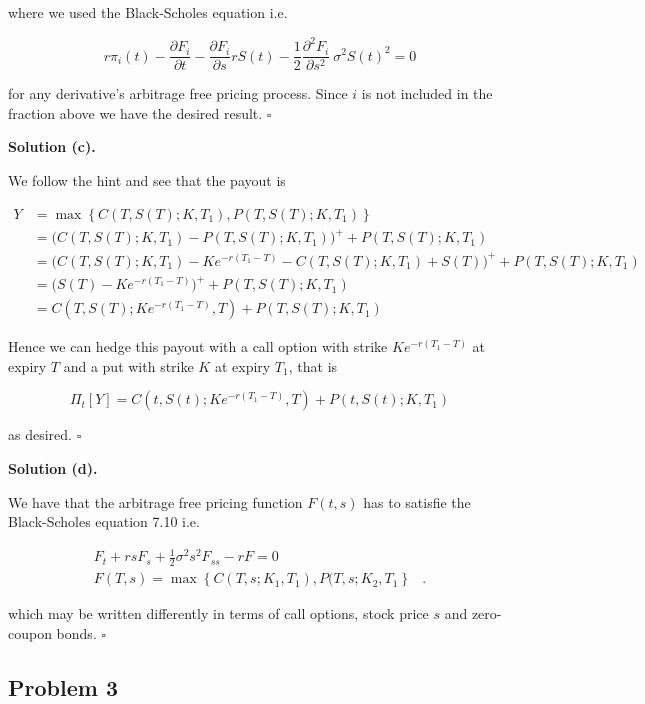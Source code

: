 \documentclass[
]{book}
\begin{document}
where we used the Black-Scholes equation i.e.

\[
r\pi_i(t)-\frac{\partial F_i}{\partial t}-\frac{\partial F_i}{\partial s}r S(t)-\frac{1}{2}\frac{\partial^2 F_i}{\partial s^2}\ \sigma^2 S(t)^2=0
\]

for any derivative's arbitrage free pricing process. Since \(i\) is not included in the fraction above we have the desired result. \(\square\)

\noindent\makebox[\linewidth]{\rule{\textwidth}{0.4pt}}

\textbf{Solution (c).}

We follow the hint and see that the payout is

\begin{align*}
Y&=\max\left\{C(T,S(T);K,T_1),P(T,S(T);K,T_1)\right\}\\
&=\Big(C(T,S(T);K,T_1)-P(T,S(T);K,T_1)\Big)^++P(T,S(T);K,T_1)\\
&=\Big(C(T,S(T);K,T_1)-Ke^{-r(T_1-T)}-C(T,S(T);K,T_1)+S(T)\Big)^++P(T,S(T);K,T_1)\\
&=\Big(S(T)-Ke^{-r(T_1-T)}\Big)^++P(T,S(T);K,T_1)\\
&=C(T,S(T);Ke^{-r(T_1-T)},T)+P(T,S(T);K,T_1)
\end{align*}

Hence we can hedge this payout with a call option with strike \(Ke^{-r(T_1-T)}\) at expiry \(T\) and a put with strike \(K\) at expiry \(T_1\), that is

\[
\Pi_t[Y]=C(t,S(t);Ke^{-r(T_1-T)},T)+P(t,S(t);K,T_1)
\]

as desired. \(\square\)

\noindent\makebox[\linewidth]{\rule{\textwidth}{0.4pt}}

\textbf{Solution (d).}

We have that the arbitrage free pricing function \(F(t,s)\) has to satisfie the Black-Scholes equation 7.10 i.e.

\begin{align*}
F_t+rsF_s+\frac{1}{2}\sigma ^2 s^2F_{ss}-rF=0&\\
F(T,s)=\max\left\{C(T,s;K_1,T_1),P(T,s;K_2,T_1\right\}&.
\end{align*}

which may be written differently in terms of call options, stock price \(s\) and zero-coupon bonds. \(\square\)

\noindent\makebox[\linewidth]{\rule{\textwidth}{0.4pt}}

\hypertarget{problem-3-1}{%
\subsection{Problem 3}\label{problem-3-1}}
\end{document}
